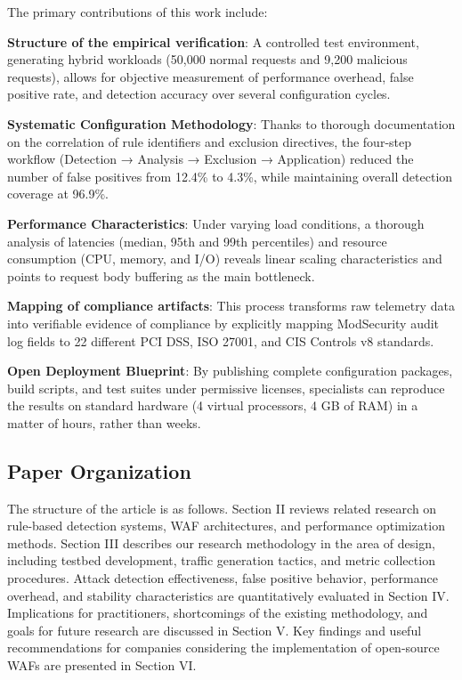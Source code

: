 \documentclass[10pt,conference]{IEEEtran}
\begin{document}
The primary contributions of this work include:

\textbf{Structure of the empirical verification}: A controlled test environment, generating hybrid workloads (50,000 normal requests and 9,200 malicious requests), allows for objective measurement of performance overhead, false positive rate, and detection accuracy over several configuration cycles.

\textbf{Systematic Configuration Methodology}: Thanks to thorough documentation on the correlation of rule identifiers and exclusion directives, the four-step workflow (Detection → Analysis → Exclusion → Application) reduced the number of false positives from 12.4\% to 4.3\%, while maintaining overall detection coverage at 96.9\%.

\textbf{Performance Characteristics}: Under varying load conditions, a thorough analysis of latencies (median, 95th and 99th percentiles) and resource consumption (CPU, memory, and I/O) reveals linear scaling characteristics and points to request body buffering as the main bottleneck.

\textbf{Mapping of compliance artifacts}: This process transforms raw telemetry data into verifiable evidence of compliance by explicitly mapping ModSecurity audit log fields to 22 different PCI DSS, ISO 27001, and CIS Controls v8 standards.

\textbf{Open Deployment Blueprint}: By publishing complete configuration packages, build scripts, and test suites under permissive licenses, specialists can reproduce the results on standard hardware (4 virtual processors, 4 GB of RAM) in a matter of hours, rather than weeks.

\subsection{Paper Organization}

The structure of the article is as follows. Section II reviews related research on rule-based detection systems, WAF architectures, and performance optimization methods. Section III describes our research methodology in the area of design, including testbed development, traffic generation tactics, and metric collection procedures. Attack detection effectiveness, false positive behavior, performance overhead, and stability characteristics are quantitatively evaluated in Section IV. Implications for practitioners, shortcomings of the existing methodology, and goals for future research are discussed in Section V. Key findings and useful recommendations for companies considering the implementation of open-source WAFs are presented in Section VI.
\end{document}

